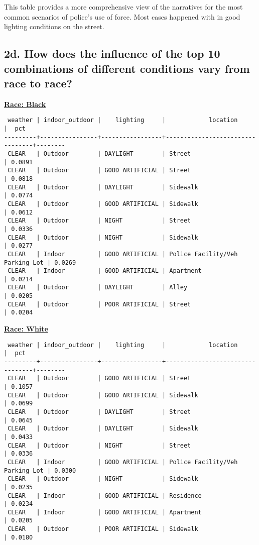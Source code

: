 \documentclass[10pt]{article}
\begin{document}
This table provides a more comprehensive view of the narratives for the most common scenarios of police's use of force. Most cases happened with in good lighting conditions on the street.


\subsection*{2d. How does the influence of the top 10 combinations of different conditions vary from race to race?}

\underline{\textbf{Race: Black}}
\begin{verbatim}
 weather | indoor_outdoor |    lighting     |            location             |  pct
---------+----------------+-----------------+---------------------------------+--------
 CLEAR   | Outdoor        | DAYLIGHT        | Street                          | 0.0891
 CLEAR   | Outdoor        | GOOD ARTIFICIAL | Street                          | 0.0818
 CLEAR   | Outdoor        | DAYLIGHT        | Sidewalk                        | 0.0774
 CLEAR   | Outdoor        | GOOD ARTIFICIAL | Sidewalk                        | 0.0612
 CLEAR   | Outdoor        | NIGHT           | Street                          | 0.0336
 CLEAR   | Outdoor        | NIGHT           | Sidewalk                        | 0.0277
 CLEAR   | Indoor         | GOOD ARTIFICIAL | Police Facility/Veh Parking Lot | 0.0269
 CLEAR   | Indoor         | GOOD ARTIFICIAL | Apartment                       | 0.0214
 CLEAR   | Outdoor        | DAYLIGHT        | Alley                           | 0.0205
 CLEAR   | Outdoor        | POOR ARTIFICIAL | Street                          | 0.0204
\end{verbatim}

\underline{\textbf{Race: White}}
\begin{verbatim}
 weather | indoor_outdoor |    lighting     |            location             |  pct
---------+----------------+-----------------+---------------------------------+--------
 CLEAR   | Outdoor        | GOOD ARTIFICIAL | Street                          | 0.1057
 CLEAR   | Outdoor        | GOOD ARTIFICIAL | Sidewalk                        | 0.0699
 CLEAR   | Outdoor        | DAYLIGHT        | Street                          | 0.0645
 CLEAR   | Outdoor        | DAYLIGHT        | Sidewalk                        | 0.0433
 CLEAR   | Outdoor        | NIGHT           | Street                          | 0.0336
 CLEAR   | Indoor         | GOOD ARTIFICIAL | Police Facility/Veh Parking Lot | 0.0300
 CLEAR   | Outdoor        | NIGHT           | Sidewalk                        | 0.0235
 CLEAR   | Indoor         | GOOD ARTIFICIAL | Residence                       | 0.0234
 CLEAR   | Indoor         | GOOD ARTIFICIAL | Apartment                       | 0.0205
 CLEAR   | Outdoor        | POOR ARTIFICIAL | Sidewalk                        | 0.0180
\end{verbatim}
\end{document}
